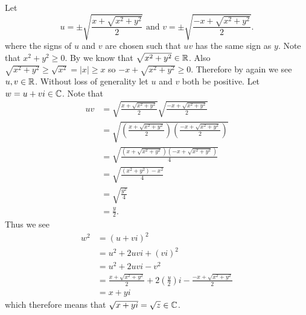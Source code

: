 \begin{questions}
    \item Let
    \[
        u = \pm\sqrt{\frac{x + \sqrt{x^2+y^2}}{2}} \text{ and } v = \pm\sqrt{\frac{-x + \sqrt{x^2+y^2}}{2}}.
    \]
    where the signs of $u$ and $v$ are chosen such that $uv$ has the same sign as $y$. Note that $x^2 + y^2 \geq 0$. By  we know that $\sqrt{x^2+y^2} \in \mathbb{R}$. Also $\sqrt{x^2+y^2} \geq \sqrt{x^2} = |x| \geq x$ so $-x + \sqrt{x^2+y^2} \geq 0$. Therefore by  again we see $u, v \in \mathbb{R}$. Without loss of generality let $u$ and $v$ both be positive. Let $w = u + vi \in \mathbb{C}$. Note that
    \begin{align*}
        uv &= \sqrt{\frac{x + \sqrt{x^2+y^2}}{2}}\sqrt{\frac{-x + \sqrt{x^2+y^2}}{2}}\\
        &= \sqrt{\left(\frac{x + \sqrt{x^2+y^2}}{2}\right)\left(\frac{-x + \sqrt{x^2+y^2}}{2}\right)}\\
        &= \sqrt{\frac{\left(x + \sqrt{x^2+y^2}\right)\left(-x + \sqrt{x^2+y^2}\right)}{4}}\\
        &= \sqrt{\frac{(x^2+y^2)-x^2}{4}}\\
        &= \sqrt{\frac{y^2}4}\\
        &= \frac y2.
    \end{align*}
    Thus we see
    \begin{align*}
        w^2 &= (u+vi)^2\\
        &= u^2 + 2uvi + (vi)^2\\
        &= u^2 + 2uvi - v^2\\
        &= \frac{x + \sqrt{x^2+y^2}}{2} + 2\left(\frac y2\right)i - \frac{-x + \sqrt{x^2+y^2}}{2}\\
        &= x + yi
    \end{align*}
    which therefore means that $\sqrt{x+yi} = \sqrt{z} \in \mathbb{C}$.
\end{questions}
